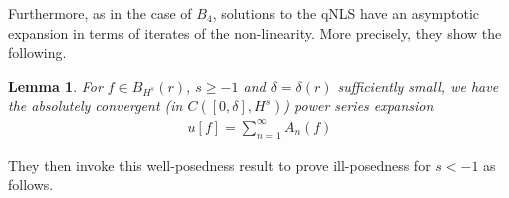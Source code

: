 \documentclass[12pt,reqno]{amsart}
\numberwithin{equation}{section}  %
\newtheorem{lemma}[theorem]{Lemma}
\begin{document}
%
%
Furthermore, as in the case of $B_{4}$, solutions to the qNLS have an asymptotic
expansion in terms of iterates of the non-linearity. More precisely, they show
the following. 
%
\begin{lemma}
  \label{lem:qnls-asymp}
  For $f \in B_{H^{s}}(r)$, $s \ge -1$ and $\delta=\delta(r)$
sufficiently small, we have the absolutely convergent
(in $C([0, \delta], H^{s})$) power series expansion
%
%
\begin{equation}
  \label{qnlspower-series-soln}
\begin{split}
  u[f] = \sum_{n=1}^{\infty} A_{n}(f)
\end{split}
\end{equation}
%
%
\end{lemma}
They then invoke this well-posedness result to prove ill-posedness for $s <
-1$ as follows.
%
%
%
%
\end{document}
